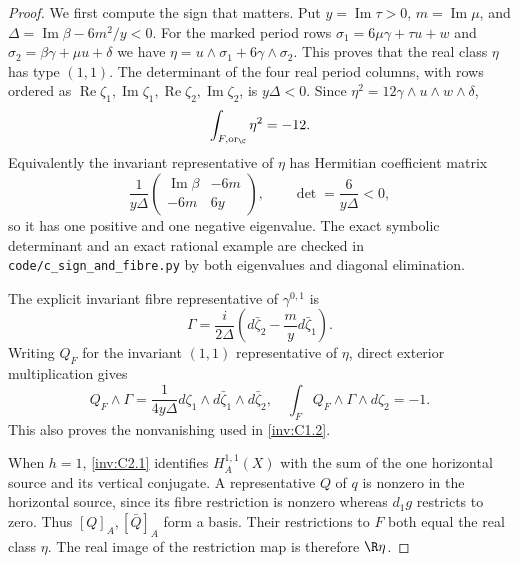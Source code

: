 \begin{proof}
We first compute the sign that matters.  Put
$y=\operatorname{Im}\tau>0$, $m=\operatorname{Im}\mu$, and
$\Delta=\operatorname{Im}\beta-6m^2/y<0$.
For the marked period rows
$\sigma_1=6\mu\gamma+\tau u+w$ and
$\sigma_2=\beta\gamma+\mu u+\delta$ we have
$\eta=u\wedge\sigma_1+6\gamma\wedge\sigma_2$.
This proves that the real class $\eta$ has type $(1,1)$.
The determinant of the four real period columns, with rows ordered
as $\operatorname{Re}\zeta_1,\operatorname{Im}\zeta_1,
\operatorname{Re}\zeta_2,\operatorname{Im}\zeta_2$, is
$y\Delta<0$.  Since $\eta^2=12\gamma\wedge u\wedge w\wedge\delta$,
\begin{equation}\label{inv:eq:C-eta-negative}
\int_{F,\mathrm{or}_{\C}}\eta^2=-12.
\end{equation}
Equivalently the invariant representative of $\eta$ has Hermitian
coefficient matrix
\[
\frac1{y\Delta}
\begin{pmatrix}\operatorname{Im}\beta&-6m\\-6m&6y\end{pmatrix},
\qquad \det=\frac6{y\Delta}<0,
\]
so it has one positive and one negative eigenvalue.  The exact
symbolic determinant and an exact rational example are checked in
\texttt{code/c\_sign\_and\_fibre.py} by both eigenvalues and
diagonal elimination.

The explicit invariant fibre representative of $\gamma^{0,1}$ is
\[
\Gamma=\frac{i}{2\Delta}
\left(d\bar\zeta_2-\frac myd\bar\zeta_1\right).
\]
Writing $Q_F$ for the invariant $(1,1)$ representative of $\eta$,
direct exterior multiplication gives
\[
Q_F\wedge\Gamma=
\frac1{4y\Delta}
d\zeta_1\wedge d\bar\zeta_1\wedge d\bar\zeta_2,
\quad
\int_FQ_F\wedge\Gamma\wedge d\zeta_2=-1.
\]
This also proves the nonvanishing used in \ref{inv:C1.2}.

When $h=1$, \ref{inv:C2.1} identifies $H_A^{1,1}(X)$ with the sum of the
one horizontal source and its vertical conjugate.  A representative
$Q$ of $q$ is nonzero in the horizontal source, since its fibre
restriction is nonzero whereas $d_1g$ restricts to zero.  Thus
$[Q]_A,[\bar Q]_A$ form a basis.  Their restrictions to $F$ both
equal the real class $\eta$.  The real image of the restriction map
is therefore $\R\eta$.


\end{proof}
